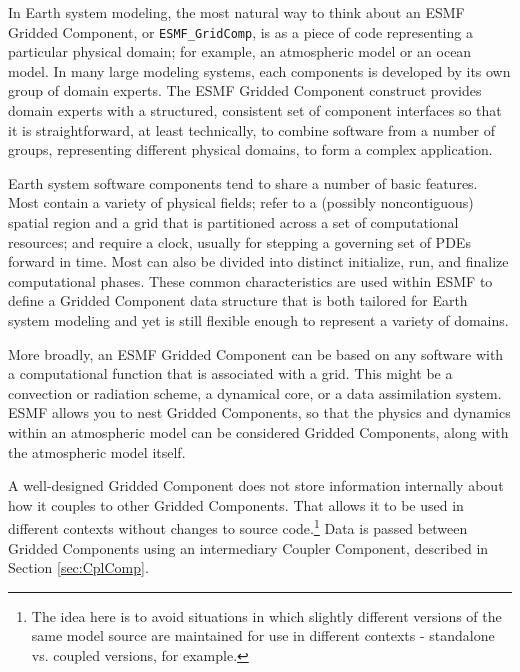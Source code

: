 %


In Earth system modeling, the most natural way to think about an ESMF 
Gridded Component, or {\tt ESMF\_GridComp}, is as a piece of code 
representing a particular physical domain; for example, an atmospheric 
model or an ocean model.  
In many large modeling systems, each components is developed by its
own group of domain experts.  The ESMF Gridded Component construct 
provides domain experts with a structured, consistent set of component 
interfaces so that it is straightforward, at least technically, to 
combine software from a number of groups, representing different physical 
domains, to form a complex application.  

Earth system software components tend to share a number of basic 
features.  Most contain a variety of physical fields; refer to 
a (possibly noncontiguous) spatial region and a grid that is 
partitioned across a set of computational resources; and require 
a clock, usually for stepping a governing set of PDEs forward in time.  
Most can also be divided into distinct initialize, run, and finalize 
computational phases.  These common characteristics are used 
within ESMF to define a Gridded Component data structure that 
is both tailored for Earth system modeling and yet is still flexible
enough to represent a variety of domains.

More broadly, an ESMF Gridded Component can be based on any 
software with a computational function that is associated with 
a grid.  This might be a convection or radiation scheme, a 
dynamical core, or a data assimilation system.  ESMF allows you
to nest Gridded Components, so that the physics and dynamics within 
an atmospheric model can be considered Gridded Components, along
with the atmospheric model itself.

A well-designed Gridded Component does not store information 
internally about how it couples to other Gridded Components.  That
allows it to be used in different contexts without changes to source
code.\footnote{The idea here is to avoid situations in which slightly
different versions of the same model source are maintained for use in 
different contexts - standalone vs. coupled versions, for example.}
Data is passed between Gridded Components using an intermediary 
Coupler Component, described in Section \ref{sec:CplComp}.

